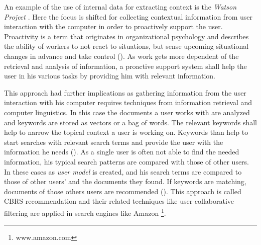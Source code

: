 An example of the use of internal data for extracting context is the \textit{Watson Project} \cite{budzik2000user}. Here the focus is shifted for collecting contextual information from user interaction with the computer in order to proactively support the user. Proactivity is a term that  originates in organizational psychology and describes the ability of workers to not react to situations, but sense upcoming situational changes in advance and take control (\cite{grant2008dynamics}). As work gets more dependent of the retrieval and analysis of information, a proactive support system shall help the user in his various tasks by providing him with relevant information. 

This approach had further implications as gathering information from the user interaction with his computer requires techniques from information retrieval and computer linguistics. In this case the documents a user works with are analyzed and keywords are stored as vectors or a bag of words. The relevant keywords shall help to narrow the topical context a user is working on. Keywords than help to start searches with relevant search terms and provide the user with the information he needs (\cite{budzik2000user}). As a single user is often not able to find the needed information, his typical search patterns are compared with those of other users. In these cases as \textit{user model} is created, and his search terms are compared to those of other users' and the documents they found. If keywords are matching, documents of those others users are recommended (\cite{anand2007contextual}). This approach is called \ac{CBRS} recommendation and their related techniques like user-collaborative filtering are applied in search engines like Amazon \footnote{www.amazon.com}.

